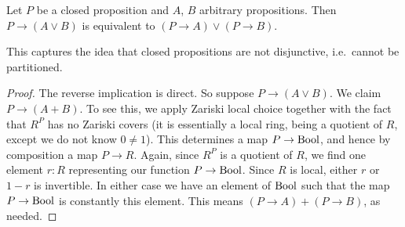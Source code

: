 \begin{lemma}
Let $P$ be a closed proposition and $A$, $B$ arbitrary propositions.
Then $P \to (A \vee B)$ is equivalent to 
$(P \to A) \vee (P \to B)$.
\end{lemma}
This captures the idea that closed propositions are not disjunctive, i.e.\ cannot
be partitioned.
\begin{proof}
The reverse implication is direct. So suppose $P \to (A \vee B)$.
We claim $P \to (A + B)$.
To see this, we apply Zariski local choice together with the fact that
$R^P$ has no Zariski covers
(it is essentially a local ring, being a quotient of $R$, except we do not know $0 \ne 1$).
This determines a map $P \to \mathrm{Bool}$, and hence by composition a map
$P \to R$. Again, since $R^P$ is a quotient of $R$, we find one element $r : R$
representing our function $P \to \mathrm{Bool}$.
Since $R$ is local, either $r$ or $1-r$ is invertible. In either case we have
an element of $\mathrm{Bool}$ such that the map $P \to \mathrm{Bool}$ is constantly this element.
This means $(P \to A) + (P \to B)$, as needed.
\end{proof}
